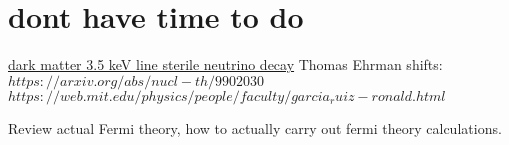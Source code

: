 \section{dont have time to do}
    \href{https://www.scientificamerican.com/article/milky-way-dark-matter-signals-in-doubt-after-controversial-new-papers/}{dark matter 3.5 keV line sterile neutrino decay}
    Thomas Ehrman shifts: $https://arxiv.org/abs/nucl-th/9902030$
    $https://web.mit.edu/physics/people/faculty/garcia_ruiz-ronald.html$

    
    Review actual Fermi theory, how to actually carry out fermi theory calculations. 